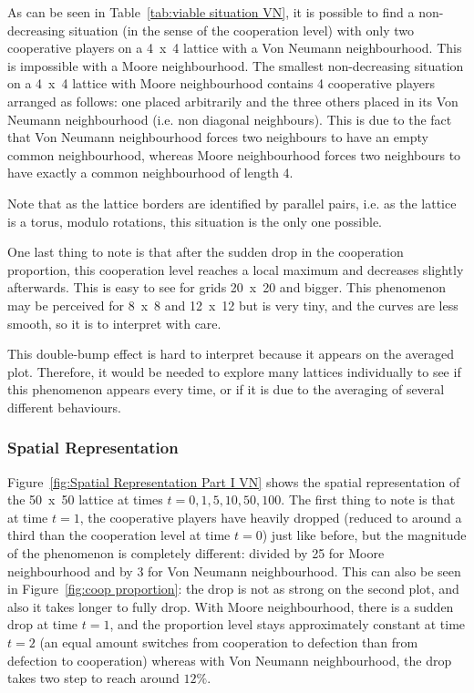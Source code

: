 \documentclass{article}
\begin{document}
As can be seen in Table~\ref{tab:viable situation VN}, it is possible to find a non-decreasing situation
(in the sense of the cooperation level) with only two cooperative players on a 4~x~4 lattice with a Von
Neumann neighbourhood. This is impossible with a Moore neighbourhood. The smallest non-decreasing situation
on a 4~x~4 lattice with Moore neighbourhood contains 4 cooperative players arranged as follows: one placed
arbitrarily and the three others placed in its Von Neumann neighbourhood (i.e. non diagonal neighbours).
This is due to the fact that Von Neumann neighbourhood forces two neighbours to have an empty common
neighbourhood, whereas Moore neighbourhood forces two neighbours to have exactly a common neighbourhood
of length 4.

Note that as the lattice borders are identified by parallel pairs, i.e. as the lattice is a torus, modulo
rotations, this situation is the only one possible.

One last thing to note is that after the sudden drop in the cooperation proportion, this cooperation level
reaches a local maximum and decreases slightly afterwards. This is easy to see for grids 20~x~20 and bigger.
This phenomenon may be perceived for 8~x~8 and 12~x~12 but is very tiny, and the curves are less smooth,
so it is to interpret with care.

This double-bump effect is hard to interpret because it appears on the averaged plot. Therefore, it would
be needed to explore many lattices individually to see if this phenomenon appears every time, or if it is
due to the averaging of several different behaviours.

\subsubsection{Spatial Representation}

Figure~\ref{fig:Spatial Representation Part I VN} shows the spatial representation of the 50~x~50 lattice
at times $t=0,1,5,10,50,100$. The first thing to note is that at time $t=1$, the cooperative players have
heavily dropped (reduced to around a third than the cooperation level at time $t=0$) just like before,
but the magnitude of the phenomenon is completely different: divided by 25 for Moore neighbourhood and
by 3 for Von Neumann neighbourhood. This can also be seen in Figure~\ref{fig:coop proportion}: the drop
is not as strong on the second plot, and also it takes longer to fully drop. With Moore neighbourhood,
there is a sudden drop at time $t=1$, and the proportion level stays approximately constant at time $t=2$
(an equal amount switches from cooperation to defection than from defection to cooperation) whereas
with Von Neumann neighbourhood, the drop takes two step to reach around $12\%$.
\end{document}

